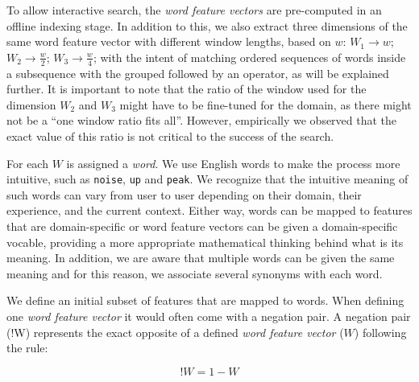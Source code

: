 To allow interactive search, the \textit{word feature vectors} are pre-computed in an offline indexing stage. In addition to this, we also extract three dimensions of the same word feature vector with different window lengths, based on $w$: $W_1 \rightarrow w$; $W_2 \rightarrow \frac{w}{2}$; $W_3 \rightarrow \frac{w}{4}$; with the intent of matching ordered sequences of words inside a subsequence with the grouped followed by an operator, as will be explained further. It is important to note that the ratio of the window used for the dimension $W_2$ and $W_3$ might have to be fine-tuned for the domain, as there might not be a “one window ratio fits all”. However, empirically we observed that the exact value of this ratio is not critical to the success of the search.

For each $W$ is assigned a \textit{word}. We use English words to make the process more intuitive, such as \texttt{noise}, \texttt{up} and \texttt{peak}. We recognize that the intuitive meaning of such words can vary from user to user depending on their domain, their experience, and the current context. Either way, words can be mapped to features that are domain-specific or word feature vectors can be given a domain-specific vocable, providing a more appropriate mathematical thinking behind what is its meaning. In addition, we are aware that multiple words can be given the same meaning and for this reason, we associate several synonyms with each word.
\par
We define an initial subset of features that are mapped to words. When defining one \textit{word feature vector} it would often come with a negation pair. A negation pair (!W) represents the exact opposite of a defined \textit{word feature vector} ($W$) following the rule:

\begin{equation}
\label{eq:neg_pair}
!W = 1-W
\end{equation}


